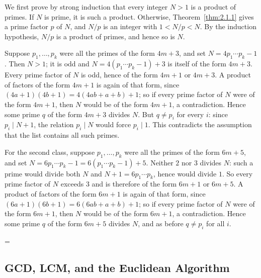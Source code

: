\documentclass[11pt]{article}
\makeatletter
\theoremstyle{ntstyle}
\let\nt@closedisplay\]
\def\nt@guardedclose{\@ifnextchar\par{\nt@closeafterpar}{\@ifnextchar\end{\postdisplaypenalty\@M\nt@closedisplay}{\nt@closedisplay}}}
\def\nt@closeafterpar\par{\@ifnextchar\par{\nt@closeafterpar}{\@ifnextchar\end{\postdisplaypenalty\@M\nt@closedisplay\par}{\nt@closedisplay\par}}}
\renewenvironment{proof}[1][\proofname]{\par
  \pushQED{\qed}\normalfont\topsep\medskipamount\edef\nt@afterproof{\@endparpenalty=\the\@endparpenalty\relax}\@beginparpenalty\@M\@endparpenalty\@M\let\]\nt@guardedclose\trivlist\item[]\textit{#1\@addpunct{.}} \ignorespaces}{\ifvmode\addpenalty\@M\fi\popQED\nt@afterproof\endtrivlist\@endpefalse}
\makeatother
\begin{document}
\begin{proof} We first prove by strong induction that every integer $N>1$ is a
	product of primes. If $N$ is prime, it is such a product. Otherwise,
	Theorem~\ref{thm:2.1.1} gives a prime factor $p$ of $N$, and $N/p$ is
	an integer with $1<N/p<N$. By the induction hypothesis, $N/p$ is a
	product of primes, and hence so is $N$.

	Suppose $p_1,\ldots,p_k$ were all the primes
	of the form $4m+3$, and set $N=4p_1\cdots p_k-1$. Then $N>1$; it is odd and
	$N=4(p_1\cdots p_k-1)+3$ is itself of the form $4m+3$. Every prime factor
	of $N$ is odd, hence of the form $4m+1$ or $4m+3$. A product of factors
	of the form $4m+1$ is again of that form, since
	$(4a+1)(4b+1)=4(4ab+a+b)+1$; so if every prime factor of $N$ were of the
	form $4m+1$, then $N$ would be of the form $4m+1$, a contradiction. Hence
	some prime $q$ of the form $4m+3$ divides $N$. But $q\neq p_i$ for every $i$: since $p_i\mid N+1$, the relation $p_i\mid N$ would force $p_i\mid1$. This contradicts the assumption that the list contains all such primes.

	For the second class, suppose $p_1,\ldots,p_k$ were all the primes of the
	form $6m+5$, and set $N=6p_1\cdots p_k-1=6(p_1\cdots p_k-1)+5$. Neither
	$2$ nor $3$ divides $N$: such a prime would divide both $N$ and
	$N+1=6p_1\cdots p_k$, hence would divide $1$. So every prime factor of
	$N$ exceeds $3$ and is therefore of the form $6m+1$ or $6m+5$. A product
	of factors of the form $6m+1$ is again of that form, since
	$(6a+1)(6b+1)=6(6ab+a+b)+1$; so if every prime factor of $N$ were of the
	form $6m+1$, then $N$ would be of the form $6m+1$, a contradiction. Hence
	some prime $q$ of the form $6m+5$ divides $N$, and as before $q\neq p_i$
	for all $i$.\qedhere

\end{proof}
\subsection{GCD, LCM, and the Euclidean Algorithm}
\end{document}
